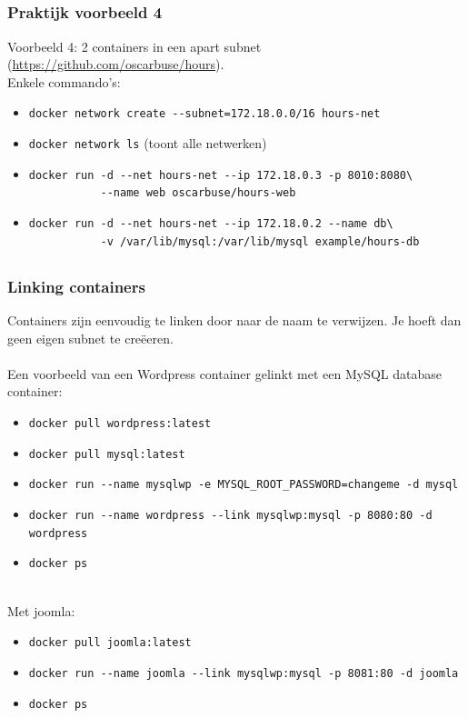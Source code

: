 \subsection{}
\begin{styleframefrag}
    \frametitle{Praktijk voorbeeld 4}
Voorbeeld 4: 2 containers in een apart subnet (\url{https://github.com/oscarbuse/hours}).\\
\pause
Enkele commando's:
\tiny
\begin{itemize}
	\item \verb!docker network create --subnet=172.18.0.0/16 hours-net!
	\pause
	\item \verb!docker network ls! (toont alle netwerken)
	\pause
	\item \verb!docker run -d --net hours-net --ip 172.18.0.3 -p 8010:8080\!\\
          \verb!           --name web oscarbuse/hours-web!
	\pause
	\item \verb!docker run -d --net hours-net --ip 172.18.0.2 --name db\!\\
		  \verb!           -v /var/lib/mysql:/var/lib/mysql example/hours-db!
\end{itemize}
\end{styleframefrag}

\subsection{}
\begin{styleframefrag}
    \frametitle{Linking containers}
\pause
Containers zijn eenvoudig te linken door naar de naam te verwijzen. Je hoeft dan geen eigen subnet te cre\"{e}eren.\\
\pause
~\\
Een voorbeeld van een Wordpress container gelinkt met een MySQL database container:
\tiny
\begin{itemize}
	\item \verb!docker pull wordpress:latest!
	\item \verb!docker pull mysql:latest!
	\item \verb!docker run --name mysqlwp -e MYSQL_ROOT_PASSWORD=changeme -d mysql!
	\item \verb!docker run --name wordpress --link mysqlwp:mysql -p 8080:80 -d wordpress!
	\item \verb!docker ps!
\end{itemize}
\pause
~\\

\small
Met joomla:
\tiny
\begin{itemize}
	\item \verb!docker pull joomla:latest!
	\item \verb!docker run --name joomla --link mysqlwp:mysql -p 8081:80 -d joomla!
	\item \verb!docker ps!
\end{itemize}

\end{styleframefrag}

